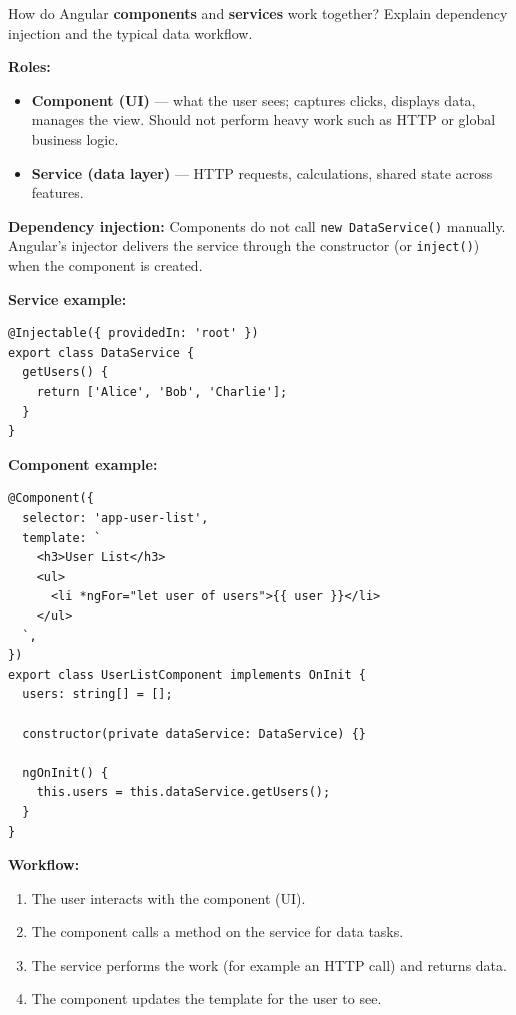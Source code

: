 \question[8]
How do Angular \textbf{components} and \textbf{services} work together? Explain dependency injection and the typical data workflow.
\begin{solutionorbox}[5.5in]
\textbf{Roles:}
\begin{itemize}
  \item \textbf{Component (UI)} --- what the user sees; captures clicks, displays data, manages the view. Should not perform heavy work such as HTTP or global business logic.
  \item \textbf{Service (data layer)} --- HTTP requests, calculations, shared state across features.
\end{itemize}

\textbf{Dependency injection:} Components do not call \lstinline[style=tsinline]|new DataService()| manually. Angular's injector delivers the service through the constructor (or \lstinline[style=tsinline]|inject()|) when the component is created.

\textbf{Service example:}
\begin{lstlisting}[style=ts]
@Injectable({ providedIn: 'root' })
export class DataService {
  getUsers() {
    return ['Alice', 'Bob', 'Charlie'];
  }
}
\end{lstlisting}

\textbf{Component example:}
\begin{lstlisting}[style=ts]
@Component({
  selector: 'app-user-list',
  template: `
    <h3>User List</h3>
    <ul>
      <li *ngFor="let user of users">{{ user }}</li>
    </ul>
  `,
})
export class UserListComponent implements OnInit {
  users: string[] = [];

  constructor(private dataService: DataService) {}

  ngOnInit() {
    this.users = this.dataService.getUsers();
  }
}
\end{lstlisting}

\textbf{Workflow:}
\begin{enumerate}
  \item The user interacts with the component (UI).
  \item The component calls a method on the service for data tasks.
  \item The service performs the work (for example an HTTP call) and returns data.
  \item The component updates the template for the user to see.
\end{enumerate}
\end{solutionorbox}




